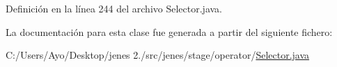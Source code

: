 Definición en la línea 244 del archivo Selector.\-java.



La documentación para esta clase fue generada a partir del siguiente fichero\-:\begin{DoxyCompactItemize}
\item 
C\-:/\-Users/\-Ayo/\-Desktop/jenes 2./src/jenes/stage/operator/\hyperlink{_selector_8java}{Selector.\-java}\end{DoxyCompactItemize}
